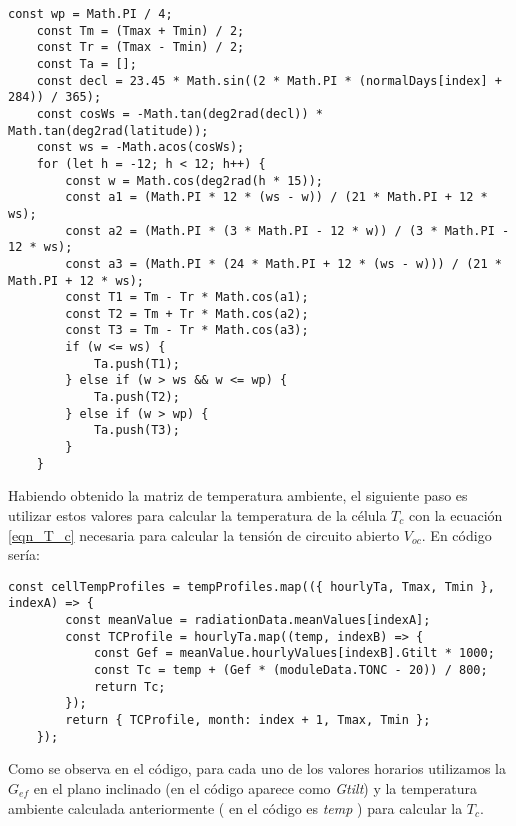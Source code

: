 \begin{lstlisting}[style=ES6, caption={Cálculo de la temperatura ambiente}]
	const wp = Math.PI / 4;
	const Tm = (Tmax + Tmin) / 2;
	const Tr = (Tmax - Tmin) / 2;
	const Ta = [];
	const decl = 23.45 * Math.sin((2 * Math.PI * (normalDays[index] + 284)) / 365);
	const cosWs = -Math.tan(deg2rad(decl)) * Math.tan(deg2rad(latitude));
	const ws = -Math.acos(cosWs);
	for (let h = -12; h < 12; h++) {
		const w = Math.cos(deg2rad(h * 15));
		const a1 = (Math.PI * 12 * (ws - w)) / (21 * Math.PI + 12 * ws);
		const a2 = (Math.PI * (3 * Math.PI - 12 * w)) / (3 * Math.PI - 12 * ws);
		const a3 = (Math.PI * (24 * Math.PI + 12 * (ws - w))) / (21 * Math.PI + 12 * ws);
		const T1 = Tm - Tr * Math.cos(a1);
		const T2 = Tm + Tr * Math.cos(a2);
		const T3 = Tm - Tr * Math.cos(a3);
		if (w <= ws) {
			Ta.push(T1);
		} else if (w > ws && w <= wp) {
			Ta.push(T2);
		} else if (w > wp) {
			Ta.push(T3);
		}
	}
\end{lstlisting}

Habiendo obtenido la matriz de temperatura ambiente, el siguiente paso es utilizar estos valores para calcular la temperatura de la célula $T_c$ con la ecuación \ref{eqn_T_c} necesaria para calcular la tensión de circuito abierto $V_{oc}$.
\newpage
En código sería:
\begin{lstlisting}[style=ES6, caption={Cálculo de la temperatura de célula}]
	const cellTempProfiles = tempProfiles.map(({ hourlyTa, Tmax, Tmin }, indexA) => {
		const meanValue = radiationData.meanValues[indexA];
		const TCProfile = hourlyTa.map((temp, indexB) => {
			const Gef = meanValue.hourlyValues[indexB].Gtilt * 1000;
			const Tc = temp + (Gef * (moduleData.TONC - 20)) / 800; 
			return Tc;
		});
		return { TCProfile, month: index + 1, Tmax, Tmin };
	});
\end{lstlisting}

Como se observa en el código, para cada uno de los valores horarios utilizamos la $G_{ef}$ en el plano inclinado (en el código aparece como \textit{Gtilt}) y la temperatura ambiente calculada anteriormente ( en el código es \textit{temp} ) para calcular la $T_c$.

